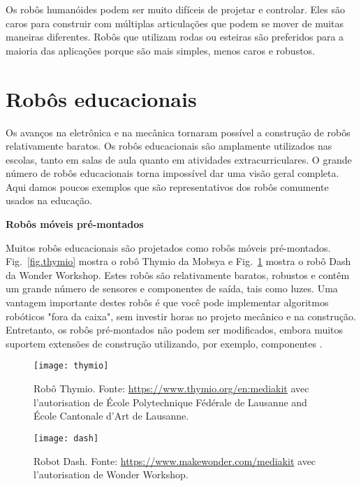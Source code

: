 Os robôs humanóides podem ser muito difíceis de projetar e controlar. Eles são caros para construir com múltiplas articulações que podem se mover de muitas maneiras diferentes. Robôs que utilizam rodas ou esteiras são preferidos para a maioria das aplicações porque são mais simples, menos caros e robustos.

\section{Robôs educacionais}\label{s.educational}

Os avanços na eletrônica e na mecânica tornaram possível a construção de robôs relativamente baratos. Os robôs educacionais são amplamente utilizados nas escolas, tanto em salas de aula quanto em atividades extracurriculares. O grande número de robôs educacionais torna impossível dar uma visão geral completa. Aqui damos poucos exemplos que são representativos dos robôs comumente usados na educação.

\smallskip

\noindent\textbf{Robôs móveis pré-montados}

Muitos robôs educacionais são projetados como robôs móveis pré-montados. Fig.~\ref{fig.thymio} mostra o robô Thymio da Mobsya e Fig.~\ref{fig.dash} mostra o robô Dash da Wonder Workshop. Estes robôs são relativamente baratos, robustos e contêm um grande número de sensores e componentes de saída, tais como luzes. Uma vantagem importante destes robôs é que você pode implementar algoritmos robóticos "fora da caixa", sem investir horas no projeto mecânico e na construção. Entretanto, os robôs pré-montados não podem ser modificados, embora muitos suportem extensões de construção utilizando, por exemplo, componentes \lego{}.

\begin{figure}
\begin{minipage}{.45\textwidth}
\begin{center}
\texttt{[image: thymio]}
\caption{Robô Thymio. Fonte: \protect\url{https://www.thymio.org/en:mediakit} avec l'autorisation de \'{E}cole Polytechnique F\'{e}d\'{e}rale de Lausanne and \'{E}cole Cantonale d'Art de Lausanne.}\label{fig.thymio}
\end{center}
\end{minipage}
\hspace{\fill}
\begin{minipage}{.45\textwidth}
\begin{center}
\texttt{[image: dash]}
\caption{Robot Dash. Fonte: \protect\url{https://www.makewonder.com/mediakit} avec l'autorisation de Wonder Workshop.}\label{fig.dash}
\end{center}
\end{minipage}
\end{figure}

